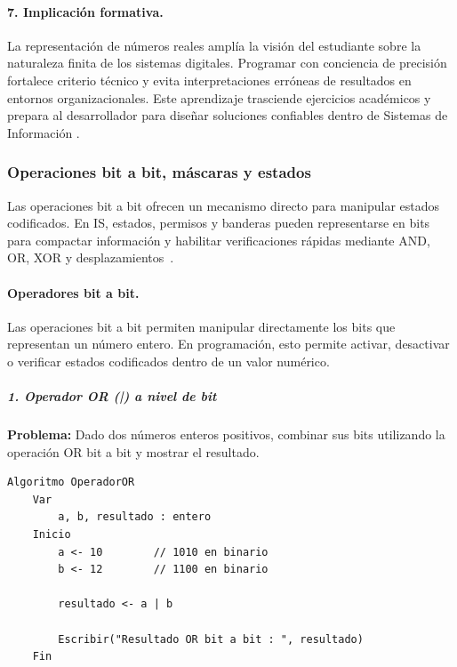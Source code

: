 \documentclass[12pt,twoside]{book}
\begin{document}
						\paragraph{7. Implicación formativa.} La representación de números reales amplía la visión del estudiante sobre la naturaleza finita de los sistemas digitales. Programar con conciencia de precisión fortalece criterio técnico y evita interpretaciones erróneas de resultados en entornos organizacionales. Este aprendizaje trasciende ejercicios académicos y prepara al desarrollador para diseñar soluciones confiables dentro de Sistemas de Información \cite{Laudon2020Management,Leidig2021Competency,Ghezzi2003Fundamentals}.
						
					\subsubsection{Operaciones bit a bit, máscaras y estados}
						\noindent
						Las operaciones bit a bit ofrecen un mecanismo directo para manipular estados codificados. En IS, estados, permisos y banderas pueden representarse en bits para compactar información y habilitar verificaciones rápidas mediante AND, OR, XOR y desplazamientos~\cite{Wirth1976Algorithms,Manzano2017Programacion,Tanenbaum2021Structured}.
						
						\paragraph{Operadores bit a bit.}
						
						Las operaciones bit a bit permiten manipular directamente los bits que representan un número entero. En programación, esto permite activar, desactivar o verificar estados codificados dentro de un valor numérico.
						
						\subparagraph{1. Operador OR (|) a nivel de bit}
						\noindent
						\textbf{Problema:} Dado dos números enteros positivos, combinar sus bits utilizando la operación OR bit a bit y mostrar el resultado.
						
						\begin{lstlisting}[style=upsamStyle,caption={Operador OR (|) a nivel de bit}]
	Algoritmo OperadorOR
	Var
		a, b, resultado : entero
	Inicio
		a <- 10        // 1010 en binario
		b <- 12        // 1100 en binario
		
		resultado <- a | b
		
		Escribir("Resultado OR bit a bit : ", resultado)
	Fin \end{lstlisting}
						
\end{document}
